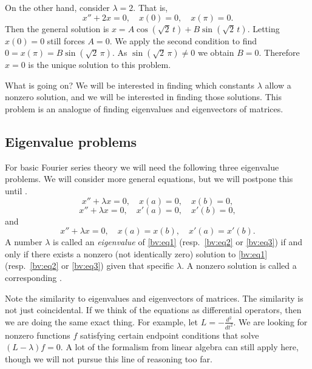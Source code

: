 \documentclass[12pt]{book}
\begin{document}
\begin{example}
On the other hand, consider $\lambda = 2$.  That is,
\begin{equation*}
x'' + 2 x = 0, \quad x(0) = 0, \quad x(\pi) = 0.
\end{equation*}
Then the general solution is
$x= A \cos (\! \sqrt{2}\,t) + B \sin (\! \sqrt{2}\,t)$.  Letting $x(0) = 0$ still
forces $A = 0$.  We apply the second condition to find
$0=x(\pi) = B \sin (\! \sqrt{2}\,\pi)$.
As $\sin (\! \sqrt{2}\,\pi) \not= 0$ we obtain
$B = 0$.  Therefore $x=0$ is the unique solution to this problem.
\end{example}

What is going on?  We will be interested in finding which
constants $\lambda$ allow a nonzero solution, and we will be interested in
finding those solutions.  This problem is an analogue of finding
eigenvalues and eigenvectors of matrices.  

\subsection{Eigenvalue problems}

For basic Fourier series theory we will need
the following three eigenvalue problems.
We will consider more general equations,
but we will postpone this until
.
\begin{equation} \label{bv:eq1}
x'' + \lambda x = 0, \quad x(a) = 0, \quad x(b) = 0 ,
\end{equation}
\begin{equation} \label{bv:eq2}
x'' + \lambda x = 0, \quad x'(a) = 0, \quad x'(b) = 0 ,
\end{equation}
and
\begin{equation} \label{bv:eq3}
x'' + \lambda x = 0, \quad x(a) = x(b), \quad x'(a) = x'(b) .
\end{equation}
A number $\lambda$ is called an
\emph{eigenvalue}
of \eqref{bv:eq1}
(resp.\ \eqref{bv:eq2} or \eqref{bv:eq3}) if and only if
there exists a nonzero (not identically zero) solution to \eqref{bv:eq1}
(resp.\ \eqref{bv:eq2} or \eqref{bv:eq3})
given that specific $\lambda$.  A
nonzero solution is called a corresponding
\emph{}.

Note the similarity to eigenvalues and eigenvectors of matrices.  The
similarity is not just coincidental.  If we think of the equations as
differential operators, then we are doing the same exact thing.  For example, 
let $L = -\frac{d^2}{{dt}^2}$.  We are looking for nonzero functions $f$
satisfying certain endpoint conditions that solve
$(L- \lambda)f = 0$.  A lot of the formalism from linear algebra can still
apply here, though we will not pursue this line of reasoning too far.
\end{document}
